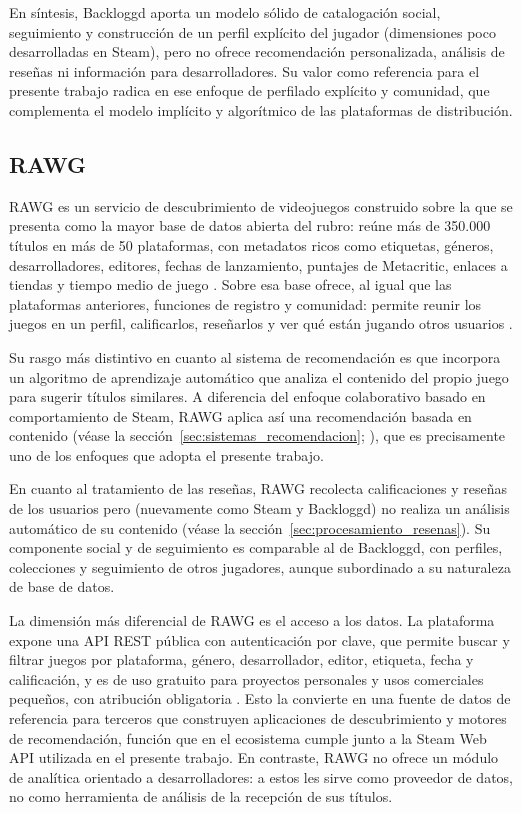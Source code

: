 En síntesis, Backloggd aporta un modelo sólido de catalogación social, seguimiento y construcción de un perfil explícito del jugador (dimensiones poco desarrolladas en Steam), pero no ofrece recomendación personalizada, análisis de reseñas ni información para desarrolladores. Su valor como referencia para el presente trabajo radica en ese enfoque de perfilado explícito y comunidad, que complementa el modelo implícito y algorítmico de las plataformas de distribución.

\subsection{RAWG}\label{subsec:rawg}

RAWG es un servicio de descubrimiento de videojuegos construido sobre la que se presenta como la mayor base de datos abierta del rubro: reúne más de 350.000 títulos en más de 50 plataformas, con metadatos ricos como etiquetas, géneros, desarrolladores, editores, fechas de lanzamiento, puntajes de Metacritic, enlaces a tiendas y tiempo medio de juego \parencite{RAWG}. Sobre esa base ofrece, al igual que las plataformas anteriores, funciones de registro y comunidad: permite reunir los juegos en un perfil, calificarlos, reseñarlos y ver qué están jugando otros usuarios \parencite{RAWG}.

Su rasgo más distintivo en cuanto al sistema de recomendación es que incorpora un algoritmo de aprendizaje automático que analiza el contenido del propio juego para sugerir títulos similares. A diferencia del enfoque colaborativo basado en comportamiento de Steam, RAWG aplica así una recomendación basada en contenido (véase la sección~\ref{sec:sistemas_recomendacion}; \parencite{KoEtAl2022}), que es precisamente uno de los enfoques que adopta el presente trabajo.

En cuanto al tratamiento de las reseñas, RAWG recolecta calificaciones y reseñas de los usuarios pero (nuevamente como Steam y Backloggd) no realiza un análisis automático de su contenido (véase la sección~\ref{sec:procesamiento_resenas}). Su componente social y de seguimiento es comparable al de Backloggd, con perfiles, colecciones y seguimiento de otros jugadores, aunque subordinado a su naturaleza de base de datos.

La dimensión más diferencial de RAWG es el acceso a los datos. La plataforma expone una API REST pública con autenticación por clave, que permite buscar y filtrar juegos por plataforma, género, desarrollador, editor, etiqueta, fecha y calificación, y es de uso gratuito para proyectos personales y usos comerciales pequeños, con atribución obligatoria \parencite{RAWG}. Esto la convierte en una fuente de datos de referencia para terceros que construyen aplicaciones de descubrimiento y motores de recomendación, función que en el ecosistema cumple junto a la Steam Web API utilizada en el presente trabajo. En contraste, RAWG no ofrece un módulo de analítica orientado a desarrolladores: a estos les sirve como proveedor de datos, no como herramienta de análisis de la recepción de sus títulos.

